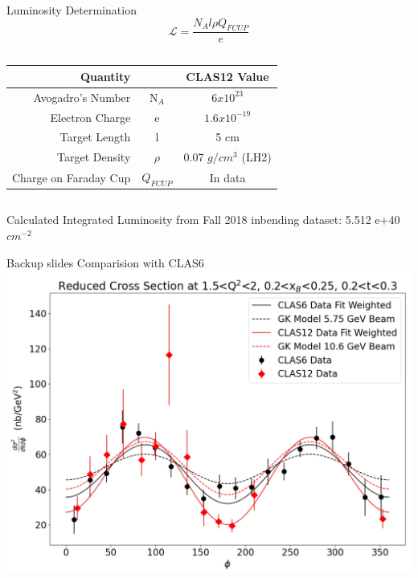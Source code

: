 \documentclass[aspectratio=169]{beamer}
\newcommand{\Lumi}{ \mathcal{L}}
\begin{document}
\begin{frame}{ Luminosity Determination}
         \begin{equation*}
                    \Lumi = \frac{N_A l \rho Q_{FCUP}}{e}
        \end{equation*}
        
        \begin{columns}
                                
                \begin{table}
                    \centering
                    \begin{tabular}{rcc}
                        Quantity &  & CLAS12 Value \\\hline
                       Avogadro's Number &  N$_A$  & $6x10^{23}$ \\
                        Electron Charge &e  &  $1.6x10^{-19}$ \\
                        Target Length &l &  5 cm \\
                        Target Density &$\rho$  &  0.07 $g/cm^3$ (LH2) \\
                        Charge on Faraday Cup & $Q_{FCUP}$ &  In data\\
                    \end{tabular}
                    \label{tab:demo}
                \end{table}
        \end{columns}
       Calculated Integrated Luminosity from Fall 2018 inbending dataset: 5.512 e+40 $cm^{-2}$
\end{frame}    

\begin{frame}{Backup slides}
\centering
Comparision with CLAS6\\

    \includegraphics[scale=0.2832]{DNP/comp_c12_gk_c6.jpg}\\
\end{frame}
\end{document}
